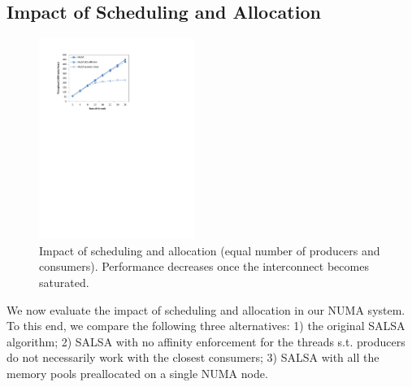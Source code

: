 
\subsection {Impact of Scheduling and Allocation}
\label{sec:numa-impact}
\begin{figure}[htb]
	\includegraphics[width=0.45\textwidth]{figures/salsa-numa-impact}
  \caption{\footnotesize{Impact of scheduling and allocation (equal number of producers and consumers). Performance decreases once the interconnect becomes saturated. }}
	\vspace{-10pt}
	\label{fig:numa-impact}
\end{figure}
We now evaluate the impact of scheduling and allocation in our NUMA system. 
To this end, we compare the following three alternatives: 1) the original SALSA algorithm; 2) SALSA with no affinity enforcement for the threads s.t. producers do not necessarily work with the closest consumers; 3) SALSA with all the memory pools preallocated on a single NUMA node. 

